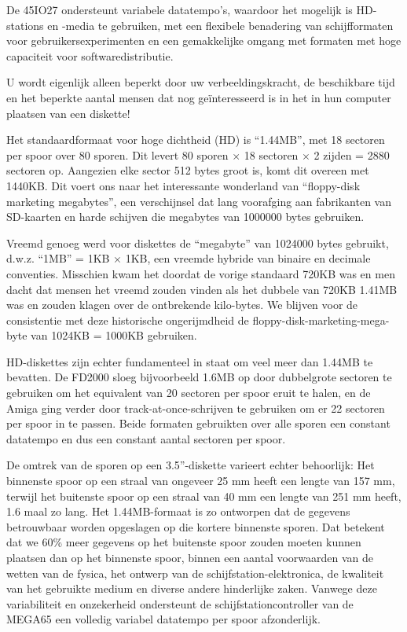 De 45IO27 ondersteunt variabele datatempo's, waardoor het mogelijk is HD-stations en -media te gebruiken, met een flexibele benadering van schijfformaten voor gebruikersexperimenten en een gemakkelijke omgang met formaten met hoge capaciteit voor softwaredistributie.

U wordt eigenlijk alleen beperkt door uw verbeeldingskracht, de beschikbare tijd en het beperkte aantal mensen dat nog geïnteresseerd is in het in hun computer plaatsen van een diskette!

Het standaardformaat voor hoge dichtheid (HD) is ``1.44MB'', met 18 sectoren per spoor over 80 sporen. Dit levert 80 sporen $\times$ 18 sectoren $\times$ 2 zijden = 2880 sectoren op. Aangezien elke sector 512 bytes groot is, komt dit overeen met 1440KB. Dit voert ons naar het interessante wonderland van ``floppy-disk marketing megabytes'', een verschijnsel dat lang voorafging aan fabrikanten van SD-kaarten en harde schijven die megabytes van 1000000 bytes gebruiken.

Vreemd genoeg werd voor diskettes de ``megabyte'' van 1024000 bytes gebruikt, d.w.z. ``1MB'' = 1KB $\times$ 1KB, een vreemde hybride van binaire en decimale conventies. Misschien kwam het doordat de vorige standaard 720KB was en men dacht dat mensen het vreemd zouden vinden als het dubbele van 720KB 1.41MB was en zouden klagen over de ontbrekende kilo-bytes. We blijven voor de consistentie met deze historische ongerijmdheid de floppy-disk-marketing-mega-byte van 1024KB = 1000KB gebruiken.

HD-diskettes zijn echter fundamenteel in staat om veel meer dan 1.44MB te bevatten. De FD2000 sloeg bijvoorbeeld 1.6MB op door dubbelgrote sectoren te gebruiken om het equivalent van 20 sectoren per spoor eruit te halen, en de Amiga ging verder door track-at-once-schrijven te gebruiken om er 22 sectoren per spoor in te passen. Beide formaten gebruikten over alle sporen een constant datatempo en dus een constant aantal sectoren per spoor.

De omtrek van de sporen op een 3.5''-diskette varieert echter behoorlijk: Het binnenste spoor op een straal van ongeveer 25 mm heeft een lengte van 157 mm, terwijl het buitenste spoor op een straal van 40 mm een lengte van 251 mm heeft, 1.6 maal zo lang. Het 1.44MB-formaat is zo ontworpen dat de gegevens betrouwbaar worden opgeslagen op die kortere binnenste sporen. Dat betekent dat we 60\% meer gegevens op het buitenste spoor zouden moeten kunnen plaatsen dan op het binnenste spoor, binnen een aantal voorwaarden van de wetten van de fysica, het ontwerp van de schijfstation-elektronica, de kwaliteit van het gebruikte medium en diverse andere hinderlijke zaken. Vanwege deze variabiliteit en onzekerheid ondersteunt de schijfstationcontroller van de MEGA65 een volledig variabel datatempo per spoor afzonderlijk.

